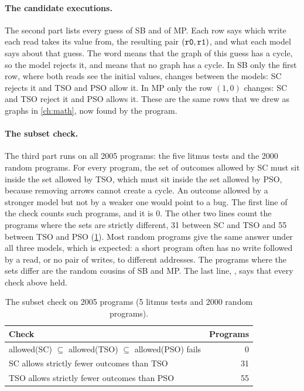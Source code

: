\paragraph{The candidate executions.} The second part lists every guess of SB and of MP. Each row says which write each read takes its value from, the resulting pair $(\texttt{r0},\texttt{r1})$, and what each model says about that guess. The word  means that the graph of this guess has a cycle, so the model rejects it, and  means that no graph has a cycle. In SB only the first row, where both reads see the initial values, changes between the models: SC rejects it and TSO and PSO allow it. In MP only the row $(1, 0)$ changes: SC and TSO reject it and PSO allows it. These are the same rows that we drew as graphs in \cref{ch:math}, now found by the program.

\paragraph{The subset check.} The third part runs on all 2005 programs: the five litmus tests and the 2000 random programs. For every program, the set of outcomes allowed by SC must sit inside the set allowed by TSO, which must sit inside the set allowed by PSO, because removing arrows cannot create a cycle. An outcome allowed by a stronger model but not by a weaker one would point to a bug. The first line of the check counts such programs, and it is 0. The other two lines count the programs where the sets are strictly different, 31 between SC and TSO and 55 between TSO and PSO (\cref{tab:subset}). Most random programs give the same answer under all three models, which is expected: a short program often has no write followed by a read, or no pair of writes, to different addresses. The programs where the sets differ are the random cousins of SB and MP. The last line, , says that every check above held.

\begin{table}[!htbp]
\centering\small
\caption{The subset check on 2005 programs (5 litmus tests and 2000 random programs).}
\label{tab:subset}
\begin{tabular}{@{}lr@{}}
\toprule
Check & Programs\\
\midrule
allowed(SC) $\subseteq$ allowed(TSO) $\subseteq$ allowed(PSO) fails & 0\\
SC allows strictly fewer outcomes than TSO & 31\\
TSO allows strictly fewer outcomes than PSO & 55\\
\bottomrule
\end{tabular}
\end{table}

